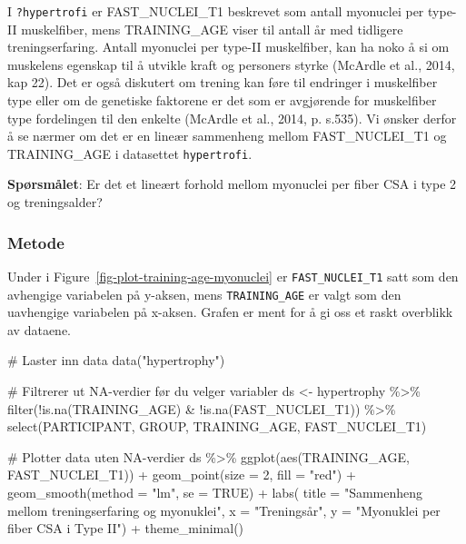 \documentclass[
  letterpaper,
  DIV=11,
  numbers=noendperiod]{scrartcl}
\newenvironment{Shaded}{\begin{snugshade}}{\end{snugshade}}
\newcommand{\AttributeTok}[1]{\textcolor[rgb]{0.40,0.45,0.13}{#1}}
\newcommand{\CommentTok}[1]{\textcolor[rgb]{0.37,0.37,0.37}{#1}}
\newcommand{\ConstantTok}[1]{\textcolor[rgb]{0.56,0.35,0.01}{#1}}
\newcommand{\DecValTok}[1]{\textcolor[rgb]{0.68,0.00,0.00}{#1}}
\newcommand{\FunctionTok}[1]{\textcolor[rgb]{0.28,0.35,0.67}{#1}}
\newcommand{\NormalTok}[1]{\textcolor[rgb]{0.00,0.23,0.31}{#1}}
\newcommand{\OtherTok}[1]{\textcolor[rgb]{0.00,0.23,0.31}{#1}}
\newcommand{\SpecialCharTok}[1]{\textcolor[rgb]{0.37,0.37,0.37}{#1}}
\newcommand{\StringTok}[1]{\textcolor[rgb]{0.13,0.47,0.30}{#1}}
\begin{document}
I \texttt{?hypertrofi} er FAST\_NUCLEI\_T1 beskrevet som antall
myonuclei per type-II muskelfiber, mens TRAINING\_AGE viser til antall
år med tidligere treningserfaring. Antall myonuclei per type-II
muskelfiber, kan ha noko å si om muskelens egenskap til å utvikle kraft
og personers styrke (McArdle et al., 2014, kap 22). Det er også
diskutert om trening kan føre til endringer i muskelfiber type eller om
de genetiske faktorene er det som er avgjørende for muskelfiber type
fordelingen til den enkelte (McArdle et al., 2014, p. s.535). Vi ønsker
derfor å se nærmer om det er en lineær sammenheng mellom
FAST\_NUCLEI\_T1 og TRAINING\_AGE i datasettet \texttt{hypertrofi}.

\textbf{Spørsmålet}: Er det et lineært forhold mellom myonuclei per
fiber CSA i type 2 og treningsalder?

\subsubsection{Metode}\label{metode-2}

Under i Figure~\ref{fig-plot-training-age-myonuclei} er
\texttt{FAST\_NUCLEI\_T1} satt som den avhengige variabelen på y-aksen,
mens \texttt{TRAINING\_AGE} er valgt som den uavhengige variabelen på
x-aksen. Grafen er ment for å gi oss et raskt overblikk av dataene.

\begin{Shaded}
\begin{Highlighting}[]
\CommentTok{\# Laster inn data}
\FunctionTok{data}\NormalTok{(}\StringTok{"hypertrophy"}\NormalTok{)}

\CommentTok{\# Filtrerer ut NA{-}verdier før du velger variabler}
\NormalTok{ds }\OtherTok{\textless{}{-}}\NormalTok{ hypertrophy }\SpecialCharTok{\%\textgreater{}\%}
  \FunctionTok{filter}\NormalTok{(}\SpecialCharTok{!}\FunctionTok{is.na}\NormalTok{(TRAINING\_AGE) }\SpecialCharTok{\&} \SpecialCharTok{!}\FunctionTok{is.na}\NormalTok{(FAST\_NUCLEI\_T1)) }\SpecialCharTok{\%\textgreater{}\%}
  \FunctionTok{select}\NormalTok{(PARTICIPANT, GROUP, TRAINING\_AGE, FAST\_NUCLEI\_T1)}

\CommentTok{\# Plotter data uten NA{-}verdier}
\NormalTok{ds }\SpecialCharTok{\%\textgreater{}\%} 
  \FunctionTok{ggplot}\NormalTok{(}\FunctionTok{aes}\NormalTok{(TRAINING\_AGE, FAST\_NUCLEI\_T1)) }\SpecialCharTok{+}
  \FunctionTok{geom\_point}\NormalTok{(}\AttributeTok{size =} \DecValTok{2}\NormalTok{, }\AttributeTok{fill =} \StringTok{"red"}\NormalTok{) }\SpecialCharTok{+}
  \FunctionTok{geom\_smooth}\NormalTok{(}\AttributeTok{method =} \StringTok{"lm"}\NormalTok{, }\AttributeTok{se =} \ConstantTok{TRUE}\NormalTok{) }\SpecialCharTok{+}
  \FunctionTok{labs}\NormalTok{(}
    \AttributeTok{title =} \StringTok{"Sammenheng mellom treningserfaring og myonuklei"}\NormalTok{,}
    \AttributeTok{x =} \StringTok{"Treningsår"}\NormalTok{, }
    \AttributeTok{y =} \StringTok{"Myonuklei per fiber CSA i Type II"}\NormalTok{) }\SpecialCharTok{+}
  \FunctionTok{theme\_minimal}\NormalTok{()}
\end{Highlighting}
\end{Shaded}
\end{document}

